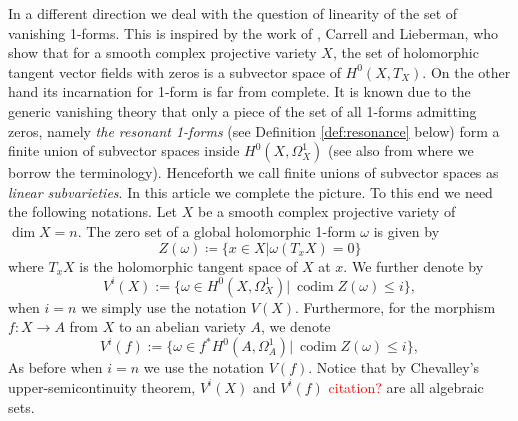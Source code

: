 \documentclass[a4paper,12pt,reqno]{amsart}
\theoremstyle{plain}
\theoremstyle{definition}
\theoremstyle{remark}
\newcommand{\C}{\mathbb C}
\newcommand{\codim}{\operatorname{codim}}
\newcommand{\sorry}[1]{\textcolor{red}{#1}}
\begin{document}
In a different direction we deal with the question
of linearity of the set of vanishing 1-forms. This is
inspired by the work of  \cite{CL73}, Carrell and Lieberman, who show that for a smooth complex projective variety $X$, the set of holomorphic tangent vector fields with zeros is a subvector space of $H^0(X, T_X)$. On the
other hand its incarnation for 1-form is far from complete.
It is known due to the generic vanishing theory
that only a piece of the set of all 1-forms admitting zeros, namely \emph{the resonant 1-forms} (see Definition \ref{def:resonance} below) 
form a finite union of subvector spaces inside $H^0(X, \Omega_X^1)$ \cite[Theorem 4.2]{Sim93} (see also \cite{DiPa13} from where
we borrow the terminology). 
Henceforth we call finite unions of subvector spaces as \emph{linear subvarieties}.
In this article we complete the picture. To this end we need the 
following notations.
Let $X$ be a smooth complex projective variety of $\dim X=n$. The zero set of a global holomorphic 1-form $\omega$
is given by 
\[Z(\omega) \coloneqq \{x\in X| \omega(T_xX) = 0\}\]
where $T_xX$ is the holomorphic tangent space of $X$ at $x$. 
We further denote by 
\[V^i(X):=\{ \omega\in H^0(X, \Omega_X^1) |\ \codim Z(\omega)\leq i\},\] when $i=n$ we simply use the notation $V(X)$.
Furthermore, for the morphism $f:X\to A$ from $X$ to an abelian variety $A$, we denote
\[V^i(f):=\{ \omega\in f^*H^0(A, \Omega_A^1) |\ \codim Z(\omega)\leq i\},\]
As before when $i=n$ we use the notation $V(f)$. Notice that by Chevalley's upper-semicontinuity theorem, $V^i(X)$ and $V^i(f)$ 
\sorry{citation?} are all algebraic sets.

\end{document}

